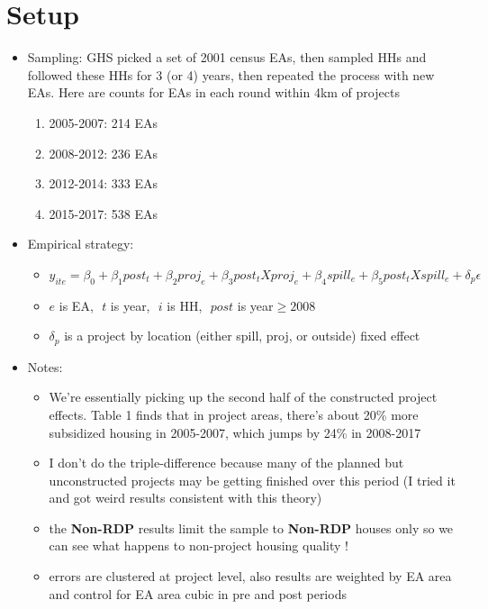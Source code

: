 \documentclass[12pt]{article}
\begin{document}
\section{Setup}
\begin{itemize}
\item Sampling: GHS picked a set of 2001 census EAs, then sampled HHs and followed these HHs for 3 (or 4) years, then repeated the process with new EAs.  Here are counts for EAs in each round within 4km of projects
\begin{enumerate}
\item 2005-2007: 214 EAs
\item 2008-2012: 236 EAs
\item 2012-2014: 333 EAs
\item 2015-2017: 538 EAs
\end{enumerate}

\item Empirical strategy: 
\begin{itemize}
    \item $y_{ite} = \beta_0 +\beta_1 post_{t} + \beta_2 proj_{e} + \beta_3 post_{t} X proj_{e} + \beta_4 spill_{e} + \beta_5 post_{t} X spill_{e} + \delta_p \epsilon$
    \item $e$ is EA,\,\, $t$ is year,\,\, $i$ is HH,\,\, $post$ is year$\geq 2008$
    \item $\delta_p$ is a project by location (either spill, proj, or outside) fixed effect
\end{itemize}
\item Notes:
\begin{itemize}
    \item We're essentially picking up the second half of the constructed project effects.  Table 1 finds that in project areas, there's about 20\% more subsidized housing in 2005-2007, which jumps by 24\% in 2008-2017
    \item I don't do the triple-difference because many of the planned but unconstructed projects may be getting finished over this period (I tried it and got weird results consistent with this theory)
    \item the \textbf{Non-RDP} results limit the sample to \textbf{Non-RDP} houses only so we can see what happens to non-project housing quality ! 
    \item errors are clustered at project level, also results are weighted by EA area and control for EA area cubic in pre and post periods
\end{itemize}

\end{itemize}
\end{document}
